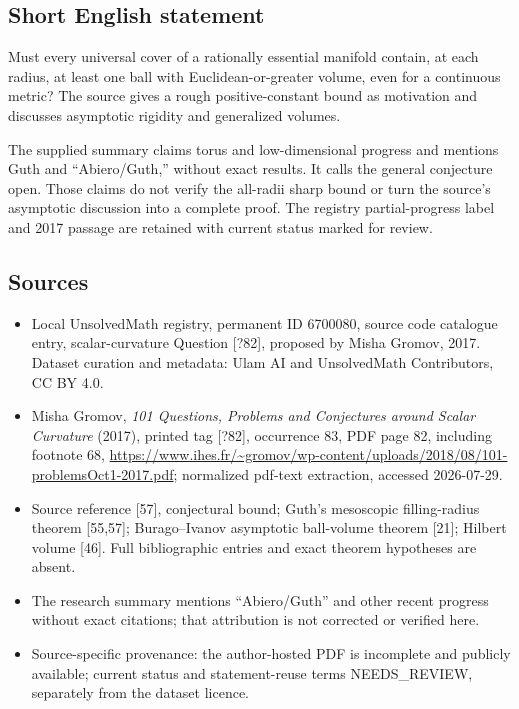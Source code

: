 \documentclass[11pt]{article}
\begin{document}
\subsection{Short English statement}
Must every universal cover of a rationally essential manifold contain, at each radius, at least one ball with Euclidean-or-greater volume, even for a continuous metric? The source gives a rough positive-constant bound as motivation and discusses asymptotic rigidity and generalized volumes.

The supplied summary claims torus and low-dimensional progress and mentions Guth and ``Abiero/Guth,'' without exact results. It calls the general conjecture open. Those claims do not verify the all-radii sharp bound or turn the source's asymptotic discussion into a complete proof. The registry partial-progress label and 2017 passage are retained with current status marked for review.
\subsection{Sources}
\begin{itemize}
\item Local UnsolvedMath registry, permanent ID 6700080, source code catalogue entry, scalar-curvature Question [?82], proposed by Misha Gromov, 2017. Dataset curation and metadata: Ulam AI and UnsolvedMath Contributors, CC BY 4.0.
\item Misha Gromov, \emph{101 Questions, Problems and Conjectures around Scalar Curvature} (2017), printed tag [?82], occurrence 83, PDF page 82, including footnote 68, \url{https://www.ihes.fr/~gromov/wp-content/uploads/2018/08/101-problemsOct1-2017.pdf}; normalized pdf-text extraction, accessed 2026-07-29.
\item Source reference [57], conjectural bound; Guth's mesoscopic filling-radius theorem [55,57]; Burago--Ivanov asymptotic ball-volume theorem [21]; Hilbert volume [46]. Full bibliographic entries and exact theorem hypotheses are absent.
\item The research summary mentions ``Abiero/Guth'' and other recent progress without exact citations; that attribution is not corrected or verified here.
\item Source-specific provenance: the author-hosted PDF is incomplete and publicly available; current status and statement-reuse terms NEEDS\_REVIEW, separately from the dataset licence.
\end{itemize}
\end{document}
